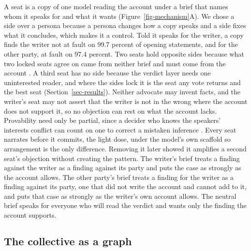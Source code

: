 A seat is a copy of one model reading the account under a brief that
names whom it speaks for and what it wants
(Figure~\ref{fig-mechanism}A).
We chose a side over a persona because a persona changes how a copy
speaks and a side fixes what it concludes, which makes it a control.
Told it speaks for the writer, a copy finds the writer not at fault on
99.7 percent of opening statements, and for the other party, at fault on
97.4
percent.
Two seats hold opposite sides because what two locked seats agree on
came from neither brief and must come from the account
\citep{milgrom1986relying,dewatripont1999advocates}.
A third seat has no side because the verdict layer needs one uninterested
reader, and where the sides lock it is the seat any vote returns and the
best seat (Section~\ref{sec-results}).
Neither advocate may invent facts, and the writer's seat may not assert
that the writer is not in the wrong where the account does not support
it, so no objection can rest on what the account lacks. Provability need
only be partial, since a decider who knows the speakers' interests
conflict can count on one to correct a mistaken inference
\citep{lipman1995robust}.
Every seat narrates before it commits, the light dose, under the model's
own scaffold so arrangement is the only
difference.
Removing it later showed it amplifies a second seat's objection without
creating the pattern.
The writer's brief treats a finding against the writer as a finding
against its party and puts the case as strongly as the account allows. The
other party's brief treats a finding for the writer as a finding against
its party, one that did not write the account and cannot add to it, and
puts that case as strongly as the writer's own account allows. The
neutral brief speaks for everyone who will read the verdict and wants only
the finding the account supports.

\subsection{The collective as a graph}
\label{sec-method-collective}

